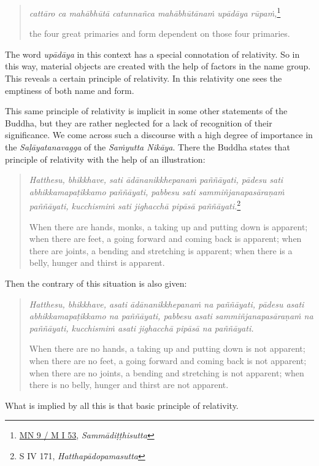 \begin{quote}
\emph{cattāro ca mahābhūtā catunnañca mahābhūtānaṁ upādāya rūpaṁ,}\footnote{\href{https://suttacentral.net/mn9/pli/ms}{MN 9 / M I 53}, \emph{Sammādiṭṭhisutta}}

the four great primaries and form dependent on those four primaries.
\end{quote}

The word \emph{upādāya} in this context has a special connotation of relativity. So in this way, material objects are created with the help of factors in the name group. This reveals a certain principle of relativity. In this relativity one sees the emptiness of both name and form.

This same principle of relativity is implicit in some other statements of the Buddha, but they are rather neglected for a lack of recognition of their significance. We come across such a discourse with a high degree of importance in the \emph{Saḷāyatanavagga} of the \emph{Saṁyutta Nikāya}. There the Buddha states that principle of relativity with the help of an illustration:

\begin{quote}
\emph{Hatthesu, bhikkhave, sati ādānanikkhepanaṁ paññāyati, pādesu sati abhikkamapaṭikkamo paññāyati, pabbesu sati sammiñjanapasāraṇaṁ paññāyati, kucchismiṁ sati jighacchā pipāsā paññāyati.}\footnote{S IV 171, \emph{Hatthapādopamasutta}}

When there are hands, monks, a taking up and putting down is apparent; when there are feet, a going forward and coming back is apparent; when there are joints, a bending and stretching is apparent; when there is a belly, hunger and thirst is apparent.
\end{quote}

Then the contrary of this situation is also given:

\begin{quote}
\emph{Hatthesu, bhikkhave, asati ādānanikkhepanaṁ na paññāyati, pādesu asati abhikkamapaṭikkamo na paññāyati, pabbesu asati sammiñjanapasāraṇaṁ na paññāyati, kucchismiṁ asati jighacchā pipāsā na paññāyati.}

When there are no hands, a taking up and putting down is not apparent; when there are no feet, a going forward and coming back is not apparent; when there are no joints, a bending and stretching is not apparent; when there is no belly, hunger and thirst are not apparent.
\end{quote}

What is implied by all this is that basic principle of relativity.

